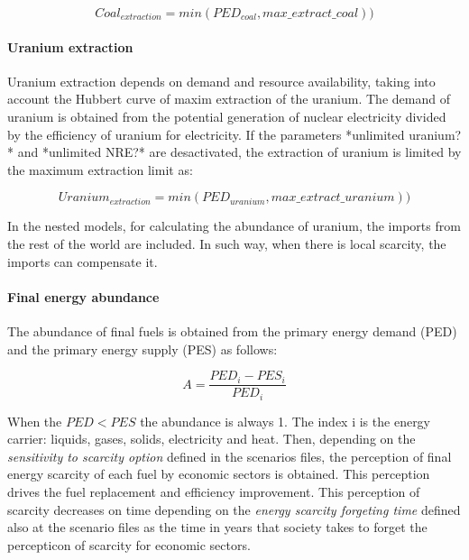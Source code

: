 \begin{equation}
Coal_{extraction}=min(PED_{coal}, max\_extract\_coal))
\label{eq:coal-extraction}
\end{equation}

\paragraph{Uranium extraction}

Uranium extraction depends on demand and resource availability, taking into account the Hubbert curve of maxim extraction of the uranium. The demand of uranium is obtained from the potential generation of nuclear electricity divided by the efficiency of uranium for electricity. If the parameters *unlimited uranium?* and *unlimited NRE?* are desactivated, the extraction of uranium is limited by the maximum extraction limit as:

\begin{equation}
Uranium_{extraction}=min(PED_{uranium}, max\_extract\_uranium))
\label{eq:uranium-extraction}
\end{equation}

In the nested models, for calculating the abundance of uranium, the imports from the rest of the world are included. In such way, when there is local scarcity, the imports can compensate it.


\paragraph{Final energy abundance}

The abundance of final fuels is obtained from the primary energy demand (PED) and the primary energy supply (PES) as follows:

\begin{equation}
A= \frac{PED_i-PES_i}{PED_i}
\label{eq:abundance-final-fuels}
\end{equation}

When the $PED<PES$ the abundance is always 1. The index i is the energy carrier: liquids, gases, solids, electricity and heat.
Then, depending on the \emph{sensitivity to scarcity option} defined in the scenarios files, the perception of final energy scarcity of each fuel by economic sectors is obtained. This perception drives the fuel replacement and efficiency improvement. This perception of scarcity decreases on time depending on the \emph{energy scarcity forgeting time} defined also at the scenario files as the time in years that society takes to forget the percepticon of scarcity for economic sectors.